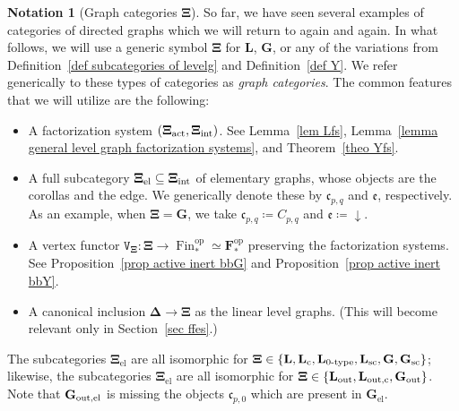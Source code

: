 \documentclass{amsart}
\numberwithin{theorem}{subsection}
\theoremstyle{definition}
\newtheorem{notation}[theorem]{Notation}
\providecommand{\op}{\mathrm{op}}
\providecommand{\xel}{\mathrm{el}}
\newcommand{\finset}{\operatorname{Fin}}
\newcommand{\pfinset}{\finset_*}
\newcommand{\finsetskel}{\mathbf{F}}
\newcommand{\pfinsetskel}{\finsetskel_*}
\newcommand{\xfe}{\mathfrak{e}}
\newcommand{\xfc}{\mathfrak{c}}
\newcommand{\name}[1]{\ensuremath{\text{\textup{#1}}}}
\newcommand{\simp}{\mathbf{\Delta}}
\newcommand{\levelg}{\mathbf{L}}
\newcommand{\levelgconn}{\levelg_{\name{c}}}
\newcommand{\bbY}{\mathbf{G}}
\newcommand{\bbYout}{\bbY_{\name{out}}}
\newcommand{\gc}{\mathbf{\Xi}}
\newcommand{\gcint}{\gc_{\name{int}}}
\newcommand{\gcact}{\gc_{\name{act}}}
\newcommand{\gcel}{\gc_{\xel}}
\newcommand{\vertex}{\mathtt{V}}
\begin{document}
\begin{notation}[Graph categories {$\gc$}]\label{notation graph categories}
So far, we have seen several examples of categories of directed graphs which we will return to again and again.
In what follows, we will use a generic symbol $\gc$ for $\levelg$, $\bbY$, or any of the variations from Definition~\ref{def subcategories of levelg} and Definition~\ref{def Y}.
We refer generically to these types of categories as \emph{graph categories}.
The common features that we will utilize are the following:
\begin{itemize}
\item A factorization system $(\gcact, \gcint)$. See Lemma~\ref{lem Lfs}, Lemma~\ref{lemma general level graph factorization systems}, and Theorem~\ref{theo Yfs}.
\item A full subcategory $\gcel \subseteq \gcint$ of elementary graphs, whose objects are the corollas and the edge. We generically denote these by $\xfc_{p,q}$ and $\xfe$, respectively.
As an example, when $\gc = \bbY$, we take $\xfc_{p,q} \coloneqq C_{p,q}$ and $\xfe \coloneqq {\downarrow}$.
\item A vertex functor $\vertex_\gc \colon \gc \to \pfinset^\op \simeq \pfinsetskel^\op$ preserving the factorization systems. See Proposition~\ref{prop active inert bbG} and Proposition~\ref{prop active inert bbY}.
\item A canonical inclusion $\simp \to \gc$ as the linear level graphs. (This will become relevant only in Section~\ref{sec ffes}.)
\end{itemize}
The subcategories $\gcel$ are all isomorphic for $\gc \in \{\levelg, \levelgconn, \levelg_{\name{0-type}}, \levelg_{\name{sc}}, \bbY, \bbY_{\name{sc}} \}$; likewise, the subcategories $\gcel$ are all isomorphic for $\gc \in \{ \levelg_{\name{out}}, \levelg_{\name{out,c}}, \bbYout \}$.
Note that $\bbY_{\name{out,el}}$ is missing the objects $\xfc_{p,0}$ which are present in $\bbY_\xel$.
\end{notation}
\end{document}

